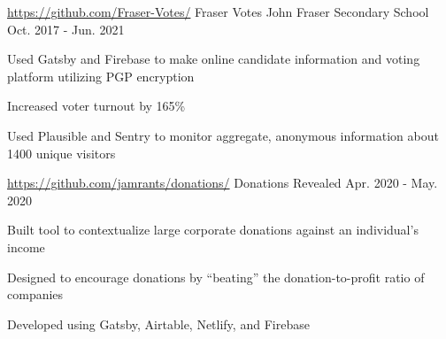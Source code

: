 

\begin{cventries}

  \cventry
    {\url{https://github.com/Fraser-Votes/}} %
    {Fraser Votes} %
    {John Fraser Secondary School} %
    {Oct. 2017 - Jun. 2021} %
    {
      \begin{cvitems} %
		\item {Used Gatsby and Firebase to make online candidate information and voting platform utilizing PGP encryption}
		\item {Increased voter turnout by 165\%}
		\item {Used Plausible and Sentry to monitor aggregate, anonymous information about 1400 unique visitors}
      \end{cvitems}
    }

  \cventry
    {\url{https://github.com/jamrants/donations/}} %
    {Donations Revealed} %
    {} %
    {Apr. 2020 - May. 2020} %
    {
      \begin{cvitems} %
        \item Built tool to contextualize large corporate donations against an individual's income
        \item Designed to encourage donations by ``beating'' the donation-to-profit ratio of companies
        \item Developed using Gatsby, Airtable, Netlify, and Firebase
      \end{cvitems}
    }

\end{cventries}
